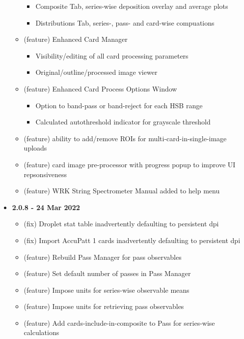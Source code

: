 \documentclass[10pt,letterpaper,titlepage]{article}
\begin{document}
\begin{itemize}
\begin{itemize}
\begin{itemize}
                \item Composite Tab, series-wise deposition overlay and average plots
                \item Distributions Tab, series-, pass- and card-wise compuations
            \end{itemize}
            \item (feature) Enhanced Card Manager
            \begin{itemize}
                \item Visibility/editing of all card processing parameters
                \item Original/outline/processed image viewer
            \end{itemize}
            \item (feature) Enhanced Card Process Options Window
            \begin{itemize}
                \item Option to band-pass or band-reject for each HSB range
                \item Calculated autothreshold indicator for grayscale threshold
            \end{itemize}
            \item (feature) ability to add/remove ROIs for multi-card-in-single-image uploads
            \item (feature) card image pre-processor with progress popup to improve UI repsonsiveness
            \item (feature) WRK String Spectrometer Manual added to help menu
        \end{itemize}
        \item \textbf{2.0.8 - 24 Mar 2022}
        \begin{itemize}
            \item (fix) Droplet stat table inadvertently defaulting to persistent dpi
            \item (fix) Import AccuPatt 1 cards inadvertently defaulting to persistent dpi
            \item (feature) Rebuild Pass Manager for pass observables
            \item (feature) Set default number of passes in Pass Manager
            \item (feature) Impose units for series-wise observable means
            \item (feature) Impose units for retrieving pass observables
            \item (feature) Add cards-include-in-composite to Pass for series-wise calculations

\end{itemize}
\end{itemize}
\end{document}
